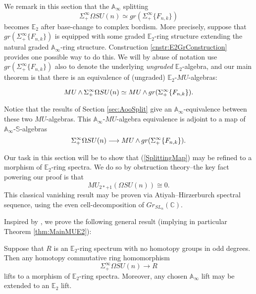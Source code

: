 
We remark in this section that the $\mathbb{A}_\infty$ splitting $$\Sigma^{\infty}_+ \Omega SU(n) \simeq gr(\Sigma^{\infty}_+ \{F_{n,k}\})$$ becomes $\mathbb{E}_2$ after base-change to complex bordism.  More precisely, suppose that $gr(\Sigma^{\infty}_+ \{F_{n,k}\})$ is equipped with some graded $\mathbb{E}_2$-ring structure extending the natural graded $\mathbb{A}_\infty$-ring structure.  Construction \ref{cnstr:E2GrConstruction} provides one possible way to do this.  We will by abuse of notation use $gr(\Sigma^{\infty}_+ \{F_{n,k}\})$ also to denote the underlying \textit{ungraded} $\mathbb{E}_2$-algebra, and our main theorem is that there is an equivalence of (ungraded) $\mathbb{E}_2$-$MU$-algebras:

$$MU \operatorname{\wedge} \Sigma^{\infty}_+ \Omega SU(n) \simeq MU \operatorname{\wedge} gr(\Sigma^{\infty}_+ \{F_{n,k}\}).$$

Notice that the results of Section \ref{sec:AooSplit} give an $\mathbb{A}_\infty$-equivalence between these two $MU$-algebras.  This $\mathbb{A}_\infty$-$MU$-algebra equivalence is adjoint to a map of $\mathbb{A}_\infty$-$\mathbb{S}$-algebras
\begin{equation} \label{SplittingMap}
\Sigma_+^{\infty} \Omega SU(n) \longrightarrow MU \operatorname{\wedge} gr(\Sigma^{\infty}_+ \{F_{n,k}\}).
\end{equation}

Our task in this section will be to show that (\ref{SplittingMap}) may be refined to a morphism of $\mathbb{E}_2$-ring spectra.  We do so by obstruction theory--the key fact powering our proof is that 
$$MU_{2*+1}\left(\Omega SU(n)\right) \cong 0.$$
This classical vanishing result may be proven via Atiyah--Hirzerburch spectral sequence, using the even cell-decomposition of $Gr_{SL_n}(\mathbb{C})$.

Inspired by \cite{ChadwickMandell}, we prove the following general result (implying in particular Theorem \ref{thm:MainMUE2}):

\begin{thm}
Suppose that $R$ is an $\mathbb{E}_2$-ring spectrum with no homotopy groups in odd degrees.  Then any homotopy commutative ring homomorphism
$$\Sigma^{\infty}_+ \Omega SU(n) \rightarrow R$$
lifts to a morphism of $\mathbb{E}_2$-ring spectra.  Moreover, any chosen $\mathbb{A}_\infty$ lift may be extended to an $\mathbb{E}_2$ lift.
\end{thm}

